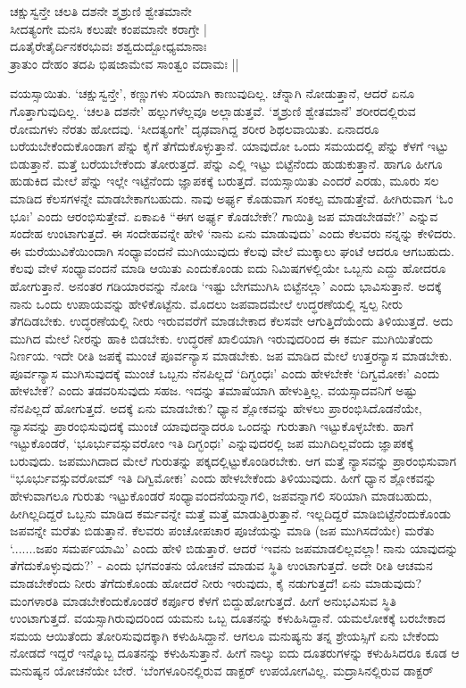 \begin{shloka}
ಚಕ್ಷುಸ್ವನ್ತೇ ಚಲತಿ ದಶನೇ ಶ್ಮಶ್ರುಣಿ ಶ್ವೇತಮಾನೇ\\
ಸೀದತ್ಯಂಗೇ ಮನಸಿ ಕಲುಷೇ ಕಂಪಮಾನೇ ಕರಾಗ್ರೇ |\\
ದೂತೈರೇತೈರ್ದಿನಕರಭುವಃ ಶಶ್ವದುದ್ಬೋಧ್ಯಮಾನಾಃ\\
ತ್ರಾತುಂ ದೇಹಂ ತದಪಿ ಭಿಷಜಾಮೇವ ಸಾಂತ್ವಂ ವದಾಮಃ ||
\end{shloka}

ವಯಸ್ಸಾಯಿತು. `ಚಕ್ಷುಸ್ವನ್ತೇ', ಕಣ್ಣುಗಳು ಸರಿಯಾಗಿ ಕಾಣುವುದಿಲ್ಲ. ಚೆನ್ನಾಗಿ ನೋಡುತ್ತಾನೆ, ಆದರೆ ಏನೂ ಗೊತ್ತಾಗುವುದಿಲ್ಲ. `ಚಲತಿ ದಶನೇ' ಹಲ್ಲುಗಳೆಲ್ಲವೂ ಅಲ್ಲಾಡುತ್ತವೆ. `ಶ್ಮಶ್ರುಣಿ ಶ್ವೇತಮಾನೆ' ಶರೀರದಲ್ಲಿರುವ ರೋಮಗಳು ನೆರತು ಹೋದವು. `ಸೀದತ್ಯಂಗೇ' ದೃಢವಾಗಿದ್ದ ಶರೀರ ಶಿಥಲವಾಯಿತು. ಏನಾದರೂ ಬರೆಯಬೇಕೆಂದುಕೊಂಡಾಗ ಪೆನ್ನು ಕೈಗೆ ತೆಗೆದುಕೊಳ್ಳುತ್ತಾನೆ. ಯಾವುದೋ ಒಂದು ಸಮಯದಲ್ಲಿ ಪೆನ್ನು ಕೆಳಗೆ ಇಟ್ಟು ಬಿಡುತ್ತಾನೆ. ಮತ್ತೆ ಬರೆಯಬೇಕೆಂದು ತೋರುತ್ತದೆ. ಪೆನ್ನು ಎಲ್ಲಿ ಇಟ್ಟು ಬಿಟ್ಟೆನೆಂದು ಹುಡುಕುತ್ತಾನೆ. ಹಾಗೂ ಹೀಗೂ ಹುಡುಕಿದ ಮೇಲೆ ಪೆನ್ನು ಇಲ್ಲೇ ಇಟ್ಟೆನೆಂದು ಜ್ಞಾಪಕಕ್ಕೆ ಬರುತ್ತದೆ. ವಯಸ್ಸಾಯಿತು ಎಂದರೆ ಎರಡು, ಮೂರು ಸಲ ಮಾಡಿದ ಕೆಲಸಗಳನ್ನೇ ಮಾಡಬೇಕಾಗಬಹುದು. ನಾವು ಅರ್ಘ್ಯ ಕೊಡುವಾಗ ಸಂಕಲ್ಪ ಮಾಡುತ್ತೇವೆ. ಹೀಗಿರುವಾಗ `ಓಂ ಭೂಃ' ಎಂದು ಆರಂಭಿಸುತ್ತೇವೆ. ಏಕಾಏಕಿ ``ಈಗ ಅರ್ಘ್ಯ ಕೊಡಬೇಕೇ? ಗಾಯಿತ್ರಿ ಜಪ ಮಾಡಬೇಡವೇ?' ಎನ್ನುವ ಸಂದೇಹ ಉಂಟಾಗುತ್ತದೆ. ಈ ಸಂದೇಹವನ್ನೇ ಹೇಳಿ `ನಾನು ಏನು ಮಾಡುವುದು' ಎಂದು ಕೆಲವರು ನನ್ನನ್ನು ಕೇಳಿದರು. ಈ ಮರೆಯುವಿಕೆಯಿಂದಾಗಿ ಸಂಧ್ಯಾವಂದನೆ ಮುಗಿಯುವುದು ಕೆಲವು ವೇಲೆ ಮುಕ್ಕಾಲು ಘಂಟೆ ಆದರೂ ಆಗಬಹುದು. ಕೆಲವು ವೇಳೆ ಸಂಧ್ಯಾವಂದನೆ ಮಾಡಿ ಆಯಿತು ಎಂದುಕೊಂಡು ಐದು ನಿಮಿಷಗಳಲ್ಲಿಯೇ ಒಬ್ಬನು ಎದ್ದು ಹೋದರೂ ಹೋಗುತ್ತಾನೆ. ಅನಂತರ ಗಡಿಯಾರವನ್ನು ನೋಡಿ `ಇಷ್ಟು ಬೇಗಮುಗಿಸಿ ಬಿಟ್ಟೆನಲ್ಲಾ' ಎಂದು ಭಾವಿಸುತ್ತಾನೆ. ಅದಕ್ಕೆ ನಾನು ಒಂದು ಉಪಾಯವನ್ನು ಹೇಳಿಕೊಟ್ಟೆನು. ಮೊದಲು ಜಪವಾದಮೇಲೆ ಉದ್ಧರಣೆಯಲ್ಲಿ ಸ್ವಲ್ಪ ನೀರು ತೆಗದಿಡಬೇಕು. ಉದ್ಧರಣೆಯಲ್ಲಿ ನೀರು ಇರುವವರೆಗೆ ಮಾಡಬೇಕಾದ ಕೆಲಸವೇ ಆಗುತ್ತಿದೆಯೆಂದು ತಿಳಿಯುತ್ತದೆ. ಅದು ಮುಗಿದ ಮೇಲೆ ನೀರನ್ನು ಹಾಕಿ ಬಿಡಬೇಕು. ಉದ್ಧರಣೆ ಖಾಲಿಯಾಗಿ ಇರುವುದರಿಂದ ಈ ಕರ್ಮ ಮುಗಿಯಿತೆಂದು ನಿರ್ಣಯ. ಇದೇ ರೀತಿ ಜಪಕ್ಕೆ ಮುಂಚೆ ಪೂರ್ವನ್ಯಾಸ ಮಾಡಬೇಕು. ಜಪ ಮಾಡಿದ ಮೇಲೆ ಉತ್ತರನ್ಯಾಸ ಮಾಡಬೇಕು. ಪೂರ್ವನ್ಯಾಸ ಮುಗಿಸುವುದಕ್ಕೆ ಮುಂಚೆ ಒಬ್ಬನು ನೆನಪಿಲ್ಲದೆ `ದಿಗ್ಭಂಧಃ' ಎಂದು ಹೇಳಬೇಕೇ `ದಿಗ್ವಮೋಕಃ' ಎಂದು ಹೇಳಬೇಕೆ? ಎಂದು ತಡವರಿಸುವುದು ಸಹಜ. ಇದನ್ನು ತಮಾಷೆಯಾಗಿ ಹೇಳುತ್ತಿಲ್ಲ. ವಯಸ್ಸಾದವನಿಗೆ ಅಷ್ಟು ನೆನಪಿಲ್ಲದೆ ಹೋಗುತ್ತದೆ. ಅದಕ್ಕೆ ಏನು ಮಾಡಬೇಕು? ಧ್ಯಾನ ಶ್ಲೋಕವನ್ನು ಹೇಳಲು ಪ್ರಾರಂಭಿಸಿದೊಡನೆಯೇ, ನ್ಯಾಸವನ್ನು ಪ್ರಾರಂಭಿಸುವುದಕ್ಕೆ ಮುಂಚೆ ಯಾವುದನ್ನಾದರೂ ಒಂದನ್ನು ಗುರುತಾಗಿ ಇಟ್ಟುಕೊಳ್ಳಬೇಕು. ಹಾಗೆ ಇಟ್ಟುಕೊಂಡರೆ, `ಭೂರ್ಭುವಸ್ಸುವರೋಂ ಇತಿ ದಿಗ್ಭಂಧಃ' ಎನ್ನುವುದರಲ್ಲಿ ಜಪ ಮುಗಿದಿಲ್ಲವೆಂದು ಜ್ಞಾಪಕಕ್ಕೆ ಬರುವುದು. ಜಪಮುಗಿದಾದ ಮೇಲೆ ಗುರುತನ್ನು ಪಕ್ಕದಲ್ಲಿಟ್ಟುಕೊಂಡಿರಬೇಕು. ಆಗ ಮತ್ತೆ ನ್ಯಾಸವನ್ನು ಪ್ರಾರಂಭಿಸುವಾಗ ``ಭೂರ್ಭುವಸ್ಸುವರೋಮ್ ಇತಿ ದಿಗ್ವಿಮೋಕಃ' ಎಂದು ಹೇಳಬೇಕೆಂದು ತಿಳಿಯುವುದು. ಹೀಗೆ ಧ್ಯಾನ ಶ್ಲೋಕವನ್ನು ಹೇಳುವಾಗಲೂ ಗುರುತು ಇಟ್ಟುಕೊಂಡರೆ ಸಂಧ್ಯಾವಂದನೆಯನ್ನಾಗಲಿ, ಜಪವನ್ನಾಗಲಿ ಸರಿಯಾಗಿ ಮಾಡಬಹುದು, ಹೀಗಿಲ್ಲದಿದ್ದರೆ ಒಬ್ಬನು ಮಾಡಿದ ಕರ್ಮವನ್ನೇ ಮತ್ತೆ ಮತ್ತೆ ಮಾಡುತ್ತಿರುತ್ತಾನೆ. ಇಲ್ಲದಿದ್ದರೆ ಮಾಡಿಬಿಟ್ಟೆನೆಂದುಕೊಂಡು ಜಪವನ್ನೇ ಮರೆತು ಬಿಡುತ್ತಾನೆ. ಕೆಲವರು ಪಂಚೋಪಚಾರ ಪೂಜೆಯನ್ನು ಮಾಡಿ (ಜಪ ಮುಗಿಸದೆಯೇ) ಮರೆತು `.......ಜಪಂ ಸಮರ್ಪಯಾಮಿ' ಎಂದು ಹೇಳಿ ಬಿಡುತ್ತಾರೆ. ಆದರೆ `ಇವನು ಜಪಮಾಡಲಿಲ್ಲವಲ್ಲಾ! ನಾನು ಯಾವುದನ್ನು ತೆಗೆದುಕೊಳ್ಳುವುದು?' - ಎಂದು ಭಗವಂತನು ಯೋಚನೆ ಮಾಡುವ ಸ್ಥಿತಿ ಉಂಟಾಗುತ್ತದೆ. ಅದೇ ರೀತಿ ಆಚಮನ ಮಾಡಬೇಕೆಂದು ನೀರು ತೆಗೆದುಕೊಂಡು ಹೋದರೆ ನೀರು ಇರುವುದು, ಕೈ ನಡುಗುತ್ತದೆ! ಏನು ಮಾಡುವುದು? ಮಂಗಳಾರತಿ ಮಾಡಬೇಕೆಂದುಕೊಂಡರೆ ಕರ್ಪೂರ ಕೆಳಗೆ ಬಿದ್ದುಹೋಗುತ್ತದೆ. ಹೀಗೆ ಅನುಭವಿಸುವ ಸ್ಥಿತಿ ಉಂಟಾಗುತ್ತದೆ. ವಯಸ್ಸಾಗಿರುವುದರಿಂದ ಯಮನು ಒಬ್ಬ ದೂತನನ್ನು ಕಳುಹಿಸಿದ್ದಾನೆ. ಯಮಲೋಕಕ್ಕೆ ಬರಬೇಕಾದ ಸಮಯ ಆಯಿತೆಂದು ತೋರಿಸುವುದಕ್ಕಾಗಿ ಕಳುಹಿಸಿದ್ದಾನೆ. ಆಗಲೂ ಮನುಷ್ಯನು ತನ್ನ ಶ್ರೇಯಸ್ಸಿಗೆ ಏನು ಬೇಕೆಂದು ನೋಡದೆ ಇದ್ದರೆ ಇನ್ನೊಬ್ಬ ದೂತನನ್ನು ಕಳುಹಿಸುತ್ತಾನೆ. ಹೀಗೆ ನಾಲ್ಕು ಐದು ದೂತರುಗಳನ್ನು ಕಳುಹಿಸಿದರೂ ಕೂಡ ಆ ಮನುಷ್ಯನ ಯೋಚನೆಯೇ ಬೇರೆ. `ಬೆಂಗಳೂರಿನಲ್ಲಿರುವ ಡಾಕ್ಟರ್ ಉಪಯೋಗವಿಲ್ಲ. ಮದ್ರಾಸಿನಲ್ಲಿರುವ ಡಾಕ್ಟರ್ 